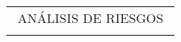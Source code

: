 \begin{adjustbox}{angle=90, captionbelow={DFMEA (Parte 3).}, float={table}[H]}

\setlength\arrayrulewidth{0.5pt}
\centering
\begin{tabular}{|ccccccccccccc|}
\hline
\multicolumn{13}{|c|}{ANÁLISIS DE RIESGOS}                                                                                                                                                                                                                                                                                                                                                                                                                                                                                                                                                                                                                                                                                                                                                                                                                                                                                                                                                                                           \\
\multicolumn{1}{|l}{}                                              & \multicolumn{1}{l}{}                                                                                                      & \multicolumn{1}{l}{}                                                                                                      & \multicolumn{1}{l}{}                                                                                                        & \multicolumn{1}{l}{}                            & \multicolumn{1}{l}{}                            & \multicolumn{1}{l}{}                            & \multicolumn{1}{l}{}                            & \multicolumn{1}{l}{}                                                                                                                                                           & \multicolumn{1}{l}{}                            & \multicolumn{1}{l}{}                            & \multicolumn{1}{l}{}                            & \multicolumn{1}{l|}{}      \\ \cline{2-8}

\end{tabular}
\end{adjustbox}
